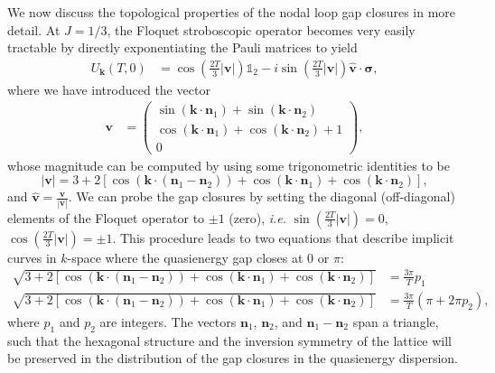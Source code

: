 \documentclass[aps,prb,twocolumn,superscriptaddress,groupedaddress]{revtex4}
\begin{document}
We now discuss the topological properties of the nodal loop gap closures in more detail.
At $J=1/3$, the Floquet stroboscopic operator becomes very easily tractable by directly exponentiating the Pauli matrices to yield
%
\begin{align}
U_{\mathbf{k}}(T,0) 
&= \cos \left( \frac{2T}{3} |\mathbf{v}| \right) \mathds{1}_2 - i \sin \left( \frac{2T}{3} |\mathbf{v}| \right) \hat{\mathbf{v}} \cdot \boldsymbol{\sigma},
\label{Floquet-operator-Kitaev-honeycomb-J-1-3}
\end{align}
%
where we have introduced the vector
%
\begin{align}
\mathbf{v} &=  \left( \begin{array}{c}
\sin\left( \mathbf{k} \cdot \mathbf{n}_1 \right) +  \sin\left( \mathbf{k} \cdot \mathbf{n}_2 \right) \\
\cos\left( \mathbf{k} \cdot \mathbf{n}_1 \right) +  \cos\left( \mathbf{k} \cdot \mathbf{n}_2 \right)  + 1 \\
0
\end{array}
\right),
\end{align}
%
whose magnitude can be computed by using some trigonometric identities to be
%
\begin{equation}
{\scriptstyle |\mathbf{v}| = 3 + 2 \left[  \cos ( \mathbf{k} \cdot (\mathbf{n}_1 - \mathbf{n}_2)) +   \cos (\mathbf{k} \cdot \mathbf{n}_1)  +  \cos ( \mathbf{k} \cdot \mathbf{n}_2)  \right]},
\end{equation}
%
and $\hat{\mathbf{v}}=\frac{\mathbf{v}}{|\mathbf{v}|}$. 
We can probe the gap closures by setting the diagonal (off-diagonal) elements of the Floquet operator to $\pm 1$ (zero), \textit{i.e.} $ \sin \left( \frac{2T}{3} |\mathbf{v}| \right) = 0$, $ \cos \left( \frac{2T}{3} |\mathbf{v}| \right) = \pm 1$.
This procedure leads to two equations that describe implicit curves in $k$-space where the quasienergy gap closes at $0$ or $\pi$:
%
\begin{align}
{\scriptstyle \sqrt{3 + 2 \left[  \cos ( \mathbf{k} \cdot (\mathbf{n}_1 - \mathbf{n}_2)) +   \cos (\mathbf{k} \cdot \mathbf{n}_1)  +  \cos ( \mathbf{k} \cdot \mathbf{n}_2)  \right]}} &= {\scriptstyle \frac{3\pi}{T} p_1}  \label{analytic-form-quasienergy-gap-0-nodal-Kitaev-honeycomb} \\
{\scriptstyle \sqrt{3 + 2 \left[  \cos ( \mathbf{k} \cdot (\mathbf{n}_1 - \mathbf{n}_2)) +   \cos (\mathbf{k} \cdot \mathbf{n}_1)  +  \cos ( \mathbf{k} \cdot \mathbf{n}_2)  \right]} } &= {\scriptstyle \frac{3\pi}{T} \left( \pi + 2\pi p_2 \right), } \label{analytic-form-quasienergy-gap-pi-nodal-Kitaev-honeycomb}
\end{align}
%
where $p_1$ and $p_2$ are integers.
The vectors $\mathbf{n}_1$, $\mathbf{n}_2$, and $\mathbf{n}_1 - \mathbf{n}_2$ span a triangle, such that the hexagonal structure and the inversion symmetry of the lattice will be preserved in the distribution of the gap closures in the quasienergy dispersion.
\end{document}
